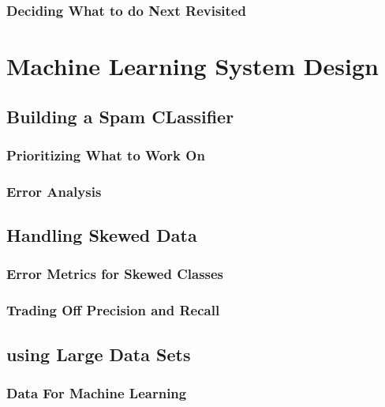 \documentclass{article}
\begin{document}
\subsubsection{Deciding What to do Next Revisited}

\section{Machine Learning System Design}
\subsection{Building a Spam CLassifier}
\subsubsection{Prioritizing What to Work On}
\subsubsection{Error Analysis}
\subsection{Handling Skewed Data}
\subsubsection{Error Metrics for Skewed Classes}
\subsubsection{Trading Off Precision and Recall}
\subsection{using Large Data Sets}
\subsubsection{Data For Machine Learning}
\end{document}
